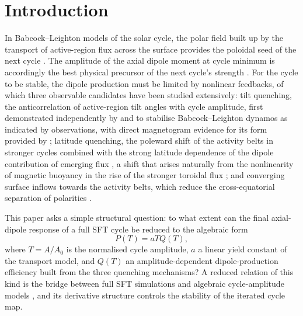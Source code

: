 \documentclass[namedreferences,hyperref,optionalrh,solaromanenum]{spr-sola}
\begin{document}
\graphicspath{{../figures_nonlinear_response_v2/}{../figures_framework/}{../figures_validation/}{../figures_multicycle/}{../figures_parameter_space/}{figures/}}

\section{Introduction}
\label{sec:introduction}

In Babcock--Leighton models of the solar cycle, the polar field built up by
the transport of active-region flux across the surface provides the
poloidal seed of the next cycle
\citep{Babcock1961,Leighton1964,Yeates2023}. The amplitude of the
axial dipole moment at cycle minimum is accordingly the best physical
precursor of the next cycle's strength \citep{Petrovay2020}. For the cycle
to be stable, the dipole production must be limited by nonlinear feedbacks,
of which three observable candidates have been studied extensively:
tilt quenching, the anticorrelation of active-region tilt angles with cycle
amplitude, first demonstrated independently by \citet{Lemerle2017} and
\citet{KarakMiesch2017} to stabilise Babcock--Leighton dynamos as
indicated by observations, with direct magnetogram evidence for its form
provided by \citet{Jha2020} \citep[see also][]{DasiEspuig2010,Jiao2021};
latitude quenching, the poleward shift of the activity belts in stronger
cycles combined with the strong latitude dependence of the dipole
contribution of emerging flux \citep{Jiang2020,Talafha2022}, a shift that
arises naturally from the nonlinearity of magnetic buoyancy in the rise of
the stronger toroidal flux \citep{Biswas2022}; and converging surface
inflows towards the activity belts, which reduce the cross-equatorial
separation of polarities
\citep{CameronSchussler2012,MartinBelda2017,Teweldebirhan2024,Talafha2025}.

This paper asks a simple structural question: to what extent can the final
axial-dipole response of a full SFT cycle be reduced to the algebraic form
%
\begin{equation}
P(T)=aTQ(T),
\label{eq:main_reduced_response}
\end{equation}
%
where $T=A/A_0$ is the normalised cycle amplitude, $a$ a linear yield
constant of the transport model, and $Q(T)$ an amplitude-dependent
dipole-production efficiency built from the three quenching mechanisms? A
reduced relation of this kind is the bridge between full SFT simulations
and algebraic cycle-amplitude models
\citep{PetrovayNagyYeates2020,Talafha2022}, and its derivative structure
controls the stability of the iterated cycle map.
\end{document}
